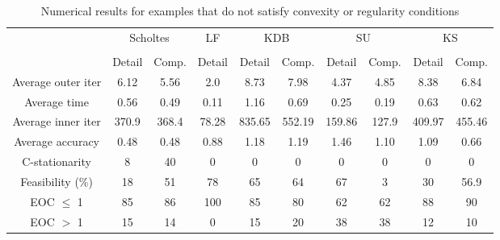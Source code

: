     
\begin{table}[h]
    \centering
    \begin{tabular}{cccccccccc}
         \toprule
          & \multicolumn{2}{c}{Scholtes} 
          & LF 
          & \multicolumn{2}{c}{KDB}
          & \multicolumn{2}{c}{SU}
          & \multicolumn{2}{c}{KS} \\
          \cline{2-3} \cline{5-6} \cline{7-8} \cline{9-10} \\
          & Detail & Comp. & Detail & Detail & Comp. & Detail & Comp. & Detail & Comp. \\
   \midrule 
   Average outer iter & 6.12 & 5.56 & 2.0 & 8.73 & 7.98 & 4.37 & 4.85 & 8.38 & 6.84 \\
   Average time & 0.56 & 0.49 & 0.11 & 1.16 & 0.69 & 0.25 & 0.19 & 0.63 & 0.62  \\
   Average inner iter & 370.9 & 368.4 & 78.28 & 835.65 &552.19 & 159.86 & 127.9 & 409.97 & 455.46 \\
   Average accuracy &  0.48 & 0.48 & 0.88 & 1.18 & 1.19 & 1.46 & 1.10 & 1.09 & 0.66\\
   C-stationarity & 8 & 40 & 0 & 0 & 0 & 0 & 0 & 0 & 0  \\
   Feasibility (\%) & 18 & 51 & 78 & 65 & 64 & 67 & 3 & 30 & 56.9 \\ 
   EOC $\leq$ 1 & 85 & 86 & 100 & 85 & 80 & 62 & 62 & 88 & 90 \\
   EOC $>$ 1& 15 & 14 & 0 & 15 & 20 & 38 & 38 & 12 & 10 \\
   \bottomrule
    \end{tabular}
    \caption{Numerical results for examples that do not satisfy convexity or regularity conditions}
    \label{tab2}
\end{table}
